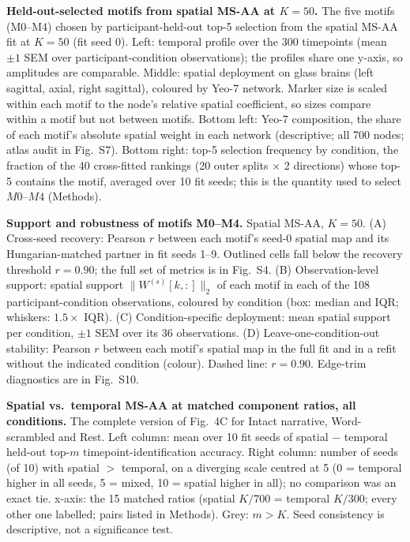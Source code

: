 \caption{\textbf{Held-out-selected motifs from spatial MS-AA at $K = 50$.}
The five motifs (M0--M4) chosen by participant-held-out top-5 selection from the spatial MS-AA fit at $K = 50$ (fit seed 0). Left: temporal profile over the 300 timepoints (mean $\pm 1$ SEM over participant-condition observations); the profiles share one y-axis, so amplitudes are comparable. Middle: spatial deployment on glass brains (left sagittal, axial, right sagittal), coloured by Yeo-7 network. Marker size is scaled within each motif to the node's relative spatial coefficient, so sizes compare within a motif but not between motifs. Bottom left: Yeo-7 composition, the share of each motif's absolute spatial weight in each network (descriptive; all 700 nodes; atlas audit in Fig.~S7). Bottom right: top-5 selection frequency by condition, the fraction of the 40 cross-fitted rankings (20 outer splits $\times$ 2 directions) whose top-5 contains the motif, averaged over 10 fit seeds; this is the quantity used to select $M0$--$M4$ (Methods).}
\label{fig:motifs}

\caption{\textbf{Support and robustness of motifs M0--M4.}
Spatial MS-AA, $K = 50$. (A) Cross-seed recovery: Pearson $r$ between each motif's seed-0 spatial map and its Hungarian-matched partner in fit seeds 1--9. Outlined cells fall below the recovery threshold $r = 0.90$; the full set of metrics is in Fig.~S4. (B) Observation-level support: spatial support $\lVert W^{(s)}[k,:] \rVert_2$ of each motif in each of the 108 participant-condition observations, coloured by condition (box: median and IQR; whiskers: $1.5 \times$ IQR). (C) Condition-specific deployment: mean spatial support per condition, $\pm 1$ SEM over its 36 observations. (D) Leave-one-condition-out stability: Pearson $r$ between each motif's spatial map in the full fit and in a refit without the indicated condition (colour). Dashed line: $r = 0.90$. Edge-trim diagnostics are in Fig.~S10.}
\label{fig:robustness}








\caption{\textbf{Spatial vs.\ temporal MS-AA at matched component ratios, all conditions.}
The complete version of Fig.~4C for Intact narrative, Word-scrambled and Rest. Left column: mean over 10 fit seeds of spatial $-$ temporal held-out top-$m$ timepoint-identification accuracy. Right column: number of seeds (of 10) with spatial $>$ temporal, on a diverging scale centred at 5 (0 = temporal higher in all seeds, 5 = mixed, 10 = spatial higher in all); no comparison was an exact tie. x-axis: the 15 matched ratios (spatial $K/700$ = temporal $K/300$; every other one labelled; pairs listed in Methods). Grey: $m > K$. Seed consistency is descriptive, not a significance test.}
\label{fig:s01}

